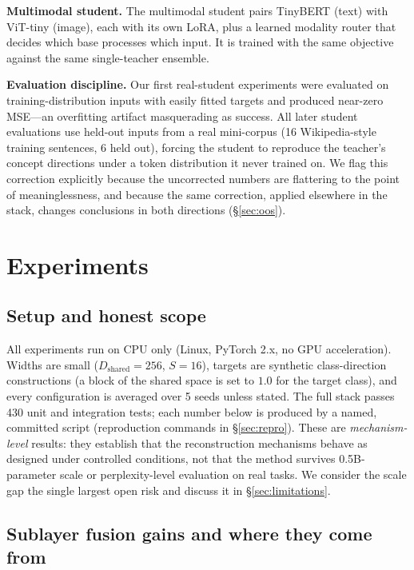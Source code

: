 \documentclass[10pt]{article}
\theoremstyle{definition}
\theoremstyle{plain}
\theoremstyle{remark}
\begin{document}
\textbf{Multimodal student.} The multimodal student pairs TinyBERT (text) with ViT-tiny (image), each with its own LoRA, plus a learned modality router that decides which base processes which input. It is trained with the same objective against the same single-teacher ensemble.

\textbf{Evaluation discipline.} Our first real-student experiments were evaluated on training-distribution inputs with easily fitted targets and produced near-zero MSE---an overfitting artifact masquerading as success. All later student evaluations use held-out inputs from a real mini-corpus (16 Wikipedia-style training sentences, 6 held out), forcing the student to reproduce the teacher's concept directions under a token distribution it never trained on. We flag this correction explicitly because the uncorrected numbers are flattering to the point of meaninglessness, and because the same correction, applied elsewhere in the stack, changes conclusions in both directions (\S\ref{sec:oos}).

\section{Experiments}
\label{sec:exp}

\subsection{Setup and honest scope}
\label{sec:exp-setup}

All experiments run on CPU only (Linux, PyTorch 2.x, no GPU acceleration). Widths are small ($D_{\text{shared}}{=}256$, $S{=}16$), targets are synthetic class-direction constructions (a block of the shared space is set to $1.0$ for the target class), and every configuration is averaged over 5 seeds unless stated. The full stack passes 430 unit and integration tests; each number below is produced by a named, committed script (reproduction commands in \S\ref{sec:repro}). These are \emph{mechanism-level} results: they establish that the reconstruction mechanisms behave as designed under controlled conditions, not that the method survives 0.5B-parameter scale or perplexity-level evaluation on real tasks. We consider the scale gap the single largest open risk and discuss it in \S\ref{sec:limitations}.

\subsection{Sublayer fusion gains and where they come from}
\label{sec:fusion-exp}
\end{document}
